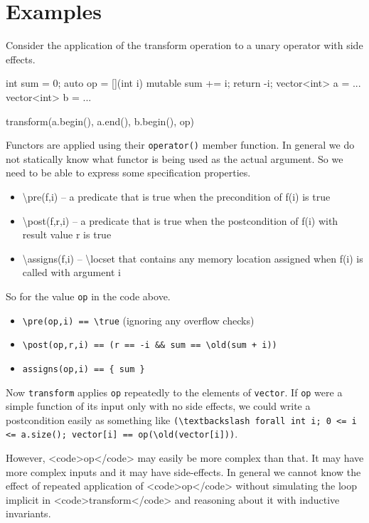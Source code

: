  
\chapter{Examples}

Consider the application of the transform operation to a unary operator with side effects.

\begin{listing-nonumber}
	
	int sum = 0;
	auto op = [](int i) mutable { sum += i; return -i; }
	vector<int> a = ...
	vector<int> b = ...
	
	transform(a.begin(), a.end(), b.begin(), op)
	
\end{listing-nonumber}

Functors are applied using their \texttt{operator()} member function. 
In general we do not statically know what functor is being used as the actual argument.
So we need to be able to express some specification properties.
\begin{itemize}
\item \textbackslash pre(f,i) -- a predicate that is true when the precondition of f(i) is true
\item \textbackslash post(f,r,i) -- a predicate that is true when the postcondition of f(i) with result value r is true
\item \textbackslash assigns(f,i) -- \textbackslash locset that contains any memory location assigned when f(i) is called with argument i
\end{itemize}
So for the value \texttt{op} in the code above.
\begin{itemize}
	\item \lstinline|\pre(op,i) == \true|  (ignoring any overflow checks)
	\item \lstinline|\post(op,r,i) == (r == -i && sum == \old(sum + i))|
	\item \lstinline|assigns(op,i) == { sum }|
\end{itemize}

Now \lstinline|transform| applies \lstinline|op| repeatedly to the elements of \lstinline|vector|. 
If \lstinline|op| were a simple function of its input only with no side effects, we could write a postcondition easily as something like
\lstinline|(\textbackslash forall int i; 0 <= i <= a.size(); vector[i] == op(\old(vector[i]))|.

However, <code>op</code> may easily be more complex than that. 
It may have more complex inputs and it may have side-effects. 
In general we cannot know the effect of repeated application of <code>op</code> without simulating the loop implicit in <code>transform</code> and reasoning about it with inductive invariants.


